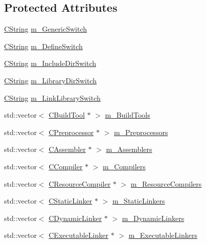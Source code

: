 \subsection*{Protected Attributes}
\begin{DoxyCompactItemize}
\item 
\hyperlink{classCString}{C\-String} \hyperlink{classCToolChain_a90d8c8aa754db91b35742c8dc57449a9}{m\-\_\-\-Generic\-Switch}
\item 
\hyperlink{classCString}{C\-String} \hyperlink{classCToolChain_a271a979b37f483a3cf68f9fe767e9762}{m\-\_\-\-Define\-Switch}
\item 
\hyperlink{classCString}{C\-String} \hyperlink{classCToolChain_a68481b8a599878126efe6a1cf5437b7e}{m\-\_\-\-Include\-Dir\-Switch}
\item 
\hyperlink{classCString}{C\-String} \hyperlink{classCToolChain_adb2c560044c351ca28ae63f185d08d7f}{m\-\_\-\-Library\-Dir\-Switch}
\item 
\hyperlink{classCString}{C\-String} \hyperlink{classCToolChain_af99b4228bcf5c250f358f2e8a2977f56}{m\-\_\-\-Link\-Library\-Switch}
\item 
std\-::vector$<$ \hyperlink{classCBuildTool}{C\-Build\-Tool} $\ast$ $>$ \hyperlink{classCToolChain_adf1e742673c39f8e11d3f03d693ecdd1}{m\-\_\-\-Build\-Tools}
\item 
std\-::vector$<$ \hyperlink{classCPreprocessor}{C\-Preprocessor} $\ast$ $>$ \hyperlink{classCToolChain_a1e8742d7819e4518f0703b3400711530}{m\-\_\-\-Preprocessors}
\item 
std\-::vector$<$ \hyperlink{classCAssembler}{C\-Assembler} $\ast$ $>$ \hyperlink{classCToolChain_ab445e06beddaf4236b604f0db7b7ae7e}{m\-\_\-\-Assemblers}
\item 
std\-::vector$<$ \hyperlink{classCCompiler}{C\-Compiler} $\ast$ $>$ \hyperlink{classCToolChain_a27d13f0c812a8498d320d71b1de8f387}{m\-\_\-\-Compilers}
\item 
std\-::vector$<$ \hyperlink{classCResourceCompiler}{C\-Resource\-Compiler} $\ast$ $>$ \hyperlink{classCToolChain_a3e599d8c68f4a561cbbe8291ff1a3471}{m\-\_\-\-Resource\-Compilers}
\item 
std\-::vector$<$ \hyperlink{classCStaticLinker}{C\-Static\-Linker} $\ast$ $>$ \hyperlink{classCToolChain_a1e20a20e78789bb05ee38b8da4ab6b3e}{m\-\_\-\-Static\-Linkers}
\item 
std\-::vector$<$ \hyperlink{classCDynamicLinker}{C\-Dynamic\-Linker} $\ast$ $>$ \hyperlink{classCToolChain_a034986cbece7eb5331c42d8842923ade}{m\-\_\-\-Dynamic\-Linkers}
\item 
std\-::vector$<$ \hyperlink{classCExecutableLinker}{C\-Executable\-Linker} $\ast$ $>$ \hyperlink{classCToolChain_a52a9b2773fc8c1ae4a31d31e3a595dda}{m\-\_\-\-Executable\-Linkers}
\end{DoxyCompactItemize}
